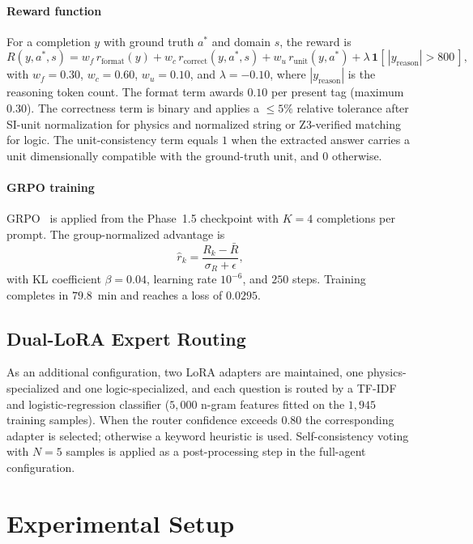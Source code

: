 \documentclass[preprint,12pt]{elsarticle}
\begin{document}
\paragraph{Reward function}
For a completion $y$ with ground truth $a^{*}$ and domain $s$, the reward is
\begin{equation}
  R(y,a^{*},s)=
    w_f\,r_{\text{format}}(y)
   +w_c\,r_{\text{correct}}(y,a^{*},s)
   +w_u\,r_{\text{unit}}(y,a^{*})
   +\lambda\,\mathbf{1}[\,|y_{\text{reason}}|>800\,],
  \label{eq:reward}
\end{equation}
with $w_f=0.30$, $w_c=0.60$, $w_u=0.10$, and $\lambda=-0.10$, where
$|y_{\text{reason}}|$ is the reasoning token count. The format term awards
$0.10$ per present tag (maximum $0.30$). The correctness term is binary and
applies a $\le 5\%$ relative tolerance after SI-unit normalization for
physics and normalized string or Z3-verified matching for logic. The
unit-consistency term equals $1$ when the extracted answer carries a unit
dimensionally compatible with the ground-truth unit, and $0$ otherwise.

\paragraph{GRPO training}
GRPO~\cite{Shao2024} is applied from the Phase~1.5 checkpoint with $K=4$
completions per prompt. The group-normalized advantage is
\begin{equation}
  \hat{r}_k=\frac{R_k-\bar{R}}{\sigma_R+\epsilon},
\end{equation}
with KL coefficient $\beta=0.04$, learning rate $10^{-6}$, and $250$ steps.
Training completes in $79.8$~min and reaches a loss of $0.0295$.

\subsection{Dual-LoRA Expert Routing}
As an additional configuration, two LoRA adapters are maintained, one
physics-specialized and one logic-specialized, and each question is routed
by a TF-IDF and logistic-regression classifier ($5{,}000$ n-gram features
fitted on the $1{,}945$ training samples). When the router confidence
exceeds $0.80$ the corresponding adapter is selected; otherwise a keyword
heuristic is used. Self-consistency voting with $N=5$ samples is applied as
a post-processing step in the full-agent configuration.

\section{Experimental Setup}
\label{sec:setup}
\end{document}

